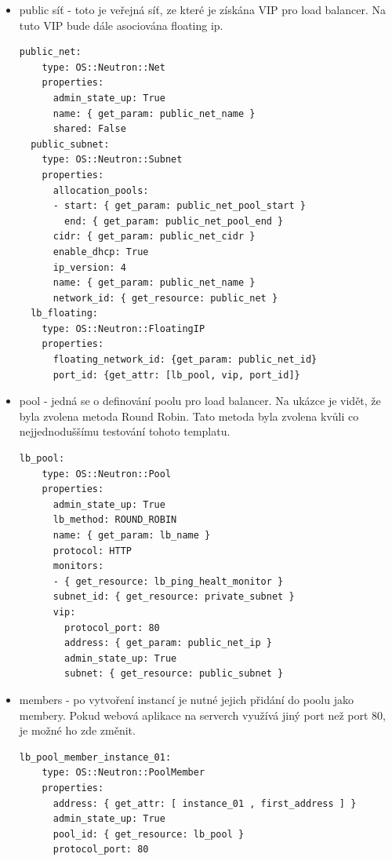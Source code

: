 \begin{itemize}
\item public síť - toto je veřejná síť, ze které je získána VIP pro load balancer. Na tuto VIP bude dále asociována floating ip. 

\begin{lstlisting}[caption=Public síť a subnet]
  public_net:
    type: OS::Neutron::Net
    properties:
      admin_state_up: True
      name: { get_param: public_net_name }
      shared: False
  public_subnet:
    type: OS::Neutron::Subnet
    properties:
      allocation_pools:
      - start: { get_param: public_net_pool_start }
        end: { get_param: public_net_pool_end }
      cidr: { get_param: public_net_cidr }
      enable_dhcp: True
      ip_version: 4
      name: { get_param: public_net_name }
      network_id: { get_resource: public_net }
  lb_floating:
    type: OS::Neutron::FloatingIP
    properties:
      floating_network_id: {get_param: public_net_id}
      port_id: {get_attr: [lb_pool, vip, port_id]}
\end{lstlisting}

\item pool - jedná se o definování poolu pro load balancer. Na ukázce je vidět, že byla zvolena metoda Round Robin. Tato metoda byla zvolena kvůli co nejjednoduššímu testování tohoto templatu.

\begin{lstlisting}[caption=Load balancer pool]
  lb_pool:
    type: OS::Neutron::Pool
    properties:
      admin_state_up: True
      lb_method: ROUND_ROBIN
      name: { get_param: lb_name }
      protocol: HTTP
      monitors:
      - { get_resource: lb_ping_healt_monitor }
      subnet_id: { get_resource: private_subnet }
      vip:
        protocol_port: 80
        address: { get_param: public_net_ip }
        admin_state_up: True
        subnet: { get_resource: public_subnet }
\end{lstlisting}

\item members - po vytvoření instancí je nutné jejich přidání do poolu jako membery. Pokud webová aplikace na serverch využívá jiný port než port 80, je možné ho zde změnit.

\begin{lstlisting}[caption=Members]
  lb_pool_member_instance_01:
    type: OS::Neutron::PoolMember
    properties:
      address: { get_attr: [ instance_01 , first_address ] }
      admin_state_up: True
      pool_id: { get_resource: lb_pool }
      protocol_port: 80
\end{lstlisting}


\end{itemize}
